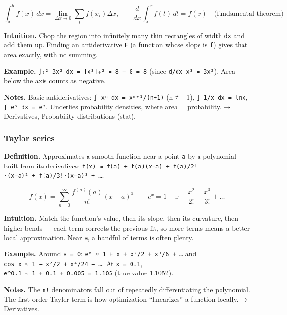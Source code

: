 \documentclass[
  10pt,
  letterpaper,
  onecolumn]{article}
\begin{document}
\begin{equation*}
\int_a^b f(x)\,dx=\lim_{\Delta x\to0}\sum_i f(x_i)\Delta x,
\qquad
\frac{d}{dx}\int_a^x f(t)\,dt=f(x)
\quad\text{(fundamental theorem)}
\end{equation*}

\textbf{Intuition.} Chop the region into infinitely many thin rectangles
of width \texttt{dx} and add them up. Finding an antiderivative
\texttt{F} (a function whose slope is \texttt{f}) gives that area
exactly, with no summing.

\textbf{Example.} \texttt{∫₀²\ 3x²\ dx\ =\ {[}x³{]}₀²\ =\ 8\ −\ 0\ =\ 8}
(since \texttt{d/dx\ x³\ =\ 3x²}). Area below the axis counts as
negative.

\textbf{Notes.} Basic antiderivatives: \texttt{∫\ xⁿ\ dx\ =\ xⁿ⁺¹/(n+1)}
(n ≠ −1), \texttt{∫\ 1/x\ dx\ =\ ln\textbar{}x\textbar{}},
\texttt{∫\ eˣ\ dx\ =\ eˣ}. Underlies probability densities, where area =
probability. → Derivatives, Probability distributions (stat).

\hypertarget{taylor-series}{%
\subsubsection{Taylor series}\label{taylor-series}}

\textbf{Definition.} Approximates a smooth function near a point
\texttt{a} by a polynomial built from its derivatives:
\texttt{f(x)\ ≈\ f(a)\ +\ f\textquotesingle{}(a)(x−a)\ +\ f\textquotesingle{}\textquotesingle{}(a)/2!·(x−a)²\ +\ f\textquotesingle{}\textquotesingle{}\textquotesingle{}(a)/3!·(x−a)³\ +\ …}.

\begin{equation*}
f(x)=\sum_{n=0}^{\infty}\frac{f^{(n)}(a)}{n!}(x-a)^n
\qquad
e^x=1+x+\frac{x^2}{2!}+\frac{x^3}{3!}+\dots
\end{equation*}

\textbf{Intuition.} Match the function's value, then its slope, then its
curvature, then higher bends --- each term corrects the previous fit, so
more terms means a better local approximation. Near \texttt{a}, a
handful of terms is often plenty.

\textbf{Example.} Around \texttt{a\ =\ 0}:
\texttt{eˣ\ ≈\ 1\ +\ x\ +\ x²/2\ +\ x³/6\ +\ …} and
\texttt{cos\ x\ ≈\ 1\ −\ x²/2\ +\ x⁴/24\ −\ …}. At \texttt{x\ =\ 0.1},
\texttt{e\^{}0.1\ ≈\ 1\ +\ 0.1\ +\ 0.005\ =\ 1.105} (true value 1.1052).

\textbf{Notes.} The \texttt{n!} denominators fall out of repeatedly
differentiating the polynomial. The first-order Taylor term is how
optimization ``linearizes'' a function locally. → Derivatives.
\end{document}
